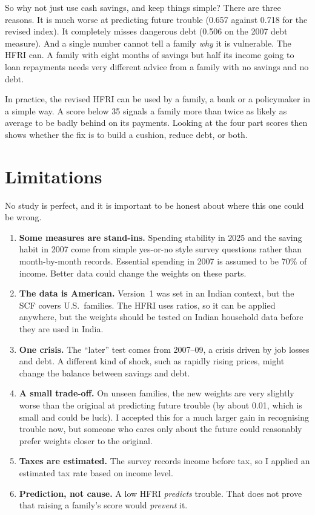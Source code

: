 \documentclass[11pt,a4paper]{article}
\newcommand{\pct}{\%}
\begin{document}
So why not just use cash savings, and keep things simple? There are three reasons. It is much worse at predicting
future trouble (0.657 against 0.718 for the revised index). It completely misses dangerous debt (0.506 on the 2007
debt measure). And a single number cannot tell a family \emph{why} it is vulnerable. The HFRI can. A family with eight
months of savings but half its income going to loan repayments needs very different advice from a family with no
savings and no debt.

In practice, the revised HFRI can be used by a family, a bank or a policymaker in a simple way. A score below 35 signals
a family more than twice as likely as average to be badly behind on its payments. Looking at the four part scores then
shows whether the fix is to build a cushion, reduce debt, or both.

\section{Limitations}
No study is perfect, and it is important to be honest about where this one could be wrong.
\begin{enumerate}
\item \textbf{Some measures are stand-ins.} Spending stability in 2025 and the saving habit in 2007 come from simple
yes-or-no style survey questions rather than month-by-month records. Essential spending in 2007 is assumed to be
70\pct{} of income. Better data could change the weights on these parts.
\item \textbf{The data is American.} Version~1 was set in an Indian context, but the SCF covers U.S.\ families. The HFRI
uses ratios, so it can be applied anywhere, but the weights should be tested on Indian household data before they are
used in India.
\item \textbf{One crisis.} The ``later'' test comes from 2007--09, a crisis driven by job losses and debt. A different kind
of shock, such as rapidly rising prices, might change the balance between savings and debt.
\item \textbf{A small trade-off.} On unseen families, the new weights are very slightly worse than the original at
predicting future trouble (by about 0.01, which is small and could be luck). I accepted this for a much larger gain in
recognising trouble now, but someone who cares only about the future could reasonably prefer weights closer to the
original.
\item \textbf{Taxes are estimated.} The survey records income before tax, so I applied an estimated tax rate based on
income level.
\item \textbf{Prediction, not cause.} A low HFRI \emph{predicts} trouble. That does not prove that raising a family's
score would \emph{prevent} it.
\end{enumerate}
\end{document}
